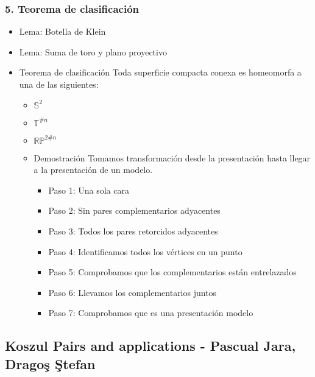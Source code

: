 \documentclass[11pt]{article}
\begin{document}
\subsubsection*{5. Teorema de clasificación}
\label{sec-1-4-8}
\begin{itemize}
\item Lema: Botella de Klein
\label{sec-1-4-8-1}
\item Lema: Suma de toro y plano proyectivo
\label{sec-1-4-8-2}
\item Teorema de clasificación
\label{sec-1-4-8-3}
Toda superficie compacta conexa es homeomorfa a una de las siguientes:

\begin{itemize}
\item $\mathbb{S}^2$
\item $\mathbb{T}^{\#n}$
\item $\mathbb{RP}^{2\#n}$
\end{itemize}

\begin{itemize}
\item Demostración
\label{sec-1-4-8-3-1}
Tomamos transformación desde la presentación hasta llegar a la
presentación de un modelo.

\begin{itemize}
\item Paso 1: Una sola cara
\label{sec-1-4-8-3-1-1}
\item Paso 2: Sin pares complementarios adyacentes
\label{sec-1-4-8-3-1-2}
\item Paso 3: Todos los pares retorcidos adyacentes
\label{sec-1-4-8-3-1-3}
\item Paso 4: Identificamos todos los vértices en un punto
\label{sec-1-4-8-3-1-4}
\item Paso 5: Comprobamos que los complementarios están entrelazados
\label{sec-1-4-8-3-1-5}
\item Paso 6: Llevamos los complementarios juntos
\label{sec-1-4-8-3-1-6}
\item Paso 7: Comprobamos que es una presentación modelo
\label{sec-1-4-8-3-1-7}
\end{itemize}
\end{itemize}
\end{itemize}
\subsection*{Koszul Pairs and applications - Pascual Jara, Dragoş Ştefan}
\label{sec-1-5}
\end{document}
